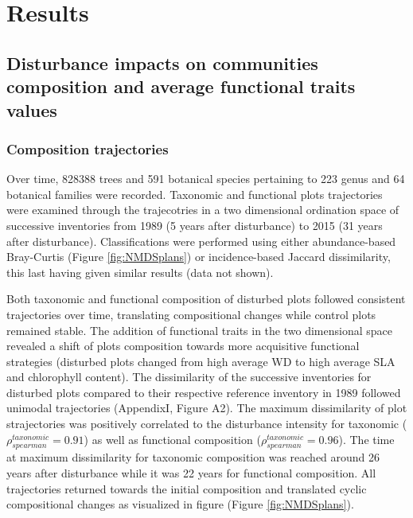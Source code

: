 \documentclass[fleqn,10pt]{ArtEcoFoG} %
\theoremstyle{definition}
\theoremstyle{definition}
\theoremstyle{definition}
\theoremstyle{remark}
\begin{document}
\section{Results}\label{results}

\subsection{Disturbance impacts on communities composition and average
functional traits
values}\label{disturbance-impacts-on-communities-composition-and-average-functional-traits-values}

\subsubsection{Composition trajectories}\label{composition-trajectories}

Over time, 828388 trees and 591 botanical species pertaining to 223
genus and 64 botanical families were recorded. Taxonomic and functional
plots trajectories were examined through the trajecotries in a two
dimensional ordination space of successive inventories from 1989 (5
years after disturbance) to 2015 (31 years after disturbance).
Classifications were performed using either abundance-based Bray-Curtis
(Figure \ref{fig:NMDSplans}) or incidence-based Jaccard dissimilarity,
this last having given similar results (data not shown).

Both taxonomic and functional composition of disturbed plots followed
consistent trajectories over time, translating compositional changes
while control plots remained stable. The addition of functional traits
in the two dimensional space revealed a shift of plots composition
towards more acquisitive functional strategies (disturbed plots changed
from high average WD to high average SLA and chlorophyll content). The
dissimilarity of the successive inventories for disturbed plots compared
to their respective reference inventory in 1989 followed unimodal
trajectories (AppendixI, Figure A2). The maximum dissimilarity of plot
strajectories was positively correlated to the disturbance intensity for
taxonomic (\(\rho_{spearman}^{taxonomic}=0.91\)) as well as functional
composition (\(\rho_{spearman}^{taxonomic}=0.96\)). The time at maximum
dissimilarity for taxonomic composition was reached around 26 years
after disturbance while it was 22 years for functional composition. All
trajectories returned towards the initial composition and translated
cyclic compositional changes as visualized in figure (Figure
\ref{fig:NMDSplans}).
\end{document}
